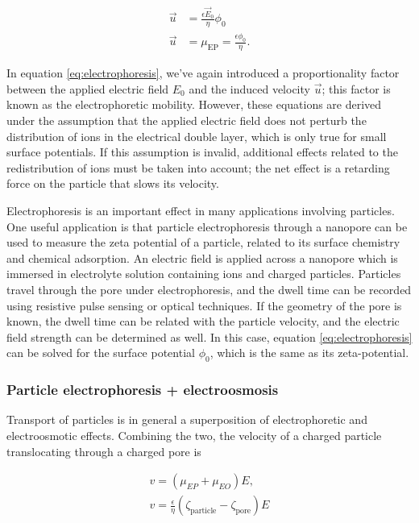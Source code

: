 			\begin{equation} \label{eq:electrophoresis}
				\begin{split}
					\vec{u} &= \frac{\epsilon\vec{E}_{0}}{\eta}\phi_{0} \\
					\vec{u} &= \mu_{\mathrm{EP}}=\frac{\epsilon\phi_{0}}{\eta}.
				\end{split}
			\end{equation}
			
			In equation \ref{eq:electrophoresis}, we've again introduced a proportionality factor between the applied electric field $E_{0}$ and the induced velocity $\vec{u}$; this factor is known as the electrophoretic mobility. However, these equations are derived under the assumption that the applied electric field does not perturb the distribution of ions in the electrical double layer, which is only true for small surface potentials. If this assumption is invalid, additional effects related to the redistribution of ions must be taken into account; the net effect is a retarding force on the particle that slows its velocity.
			
			Electrophoresis is an important effect in many applications involving particles. One useful application is that particle electrophoresis through a nanopore can be used to measure the zeta potential of a particle, related to its surface chemistry and chemical adsorption. An electric field is applied across a nanopore which is immersed in electrolyte solution containing ions and charged particles. Particles travel through the pore under electrophoresis, and the dwell time can be recorded using resistive pulse sensing or optical techniques. If the geometry of the pore is known, the dwell time can be related with the particle velocity, and the electric field strength can be determined as well. In this case, equation \ref{eq:electrophoresis} can be solved for the surface potential $\phi_{0}$, which is the same as its zeta-potential.
			
		\subsubsection{Particle electrophoresis + electroosmosis}
			Transport of particles is in general a superposition of electrophoretic and electroosmotic effects. Combining the two, the velocity of a charged particle translocating through a charged pore is 
			
			\begin{equation} \label{eq:particlevelocity}
				\begin{split}
					v=\left(\mu_{EP}+\mu_{EO}\right)E, \\
					v=\frac{\epsilon}{\eta}\left(\zeta_{\mathrm{particle}}-\zeta_{\mathrm{pore}}\right)E
				\end{split}
			\end{equation}
			
